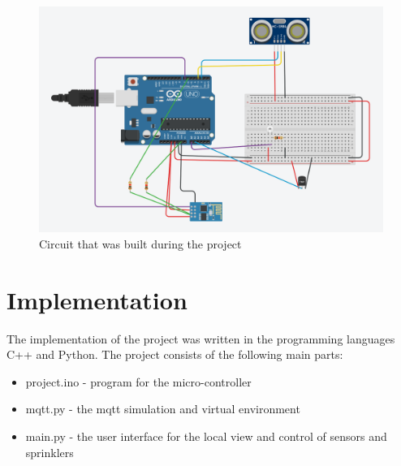 \documentclass{article}
\begin{document}
\begin{figure}
\centering
\includegraphics[scale=0.3]{scheme_cropped.png}
\caption{Circuit that was built during the project}
\label{fig:scheme}
\end{figure}
\section{Implementation}
The implementation of the project was written in the programming languages C++ and Python. The project consists of the following main parts:
\begin{itemize}
\item project.ino - program for the micro-controller
\item mqtt.py - the mqtt simulation and virtual environment
\item main.py - the user interface for the local view and control of sensors and sprinklers
\end{itemize}
\end{document}
